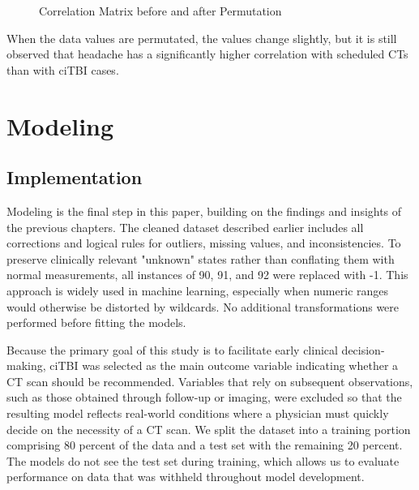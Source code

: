 \documentclass[10pt,letterpaper]{article}
\begin{document}
\begin{figure}[H]
    \centering
    \caption{Correlation Matrix before and after Permutation}
    \label{fig:stability_check}
\end{figure}

When the data values are permutated, the values change slightly, but it is still observed that headache has a significantly higher correlation with scheduled CTs than with ciTBI cases.

\section{Modeling}

\subsection{Implementation}

Modeling is the final step in this paper, building on the findings and insights of the previous chapters. The cleaned dataset described earlier includes all corrections and logical rules for outliers, missing values, and inconsistencies. To preserve clinically relevant "unknown" states rather than conflating them with normal measurements, all instances of 90, 91, and 92 were replaced with -1. This approach is widely used in machine learning, especially when numeric ranges would otherwise be distorted by wildcards. No additional transformations were performed before fitting the models.

Because the primary goal of this study is to facilitate early clinical decision-making, ciTBI was selected as the main outcome variable indicating whether a CT scan should be recommended. Variables that rely on subsequent observations, such as those obtained through follow-up or imaging, were excluded so that the resulting model reflects real-world conditions where a physician must quickly decide on the necessity of a CT scan. We split the dataset into a training portion comprising 80 percent of the data and a test set with the remaining 20 percent. The models do not see the test set during training, which allows us to evaluate performance on data that was withheld throughout model development.
\end{document}
